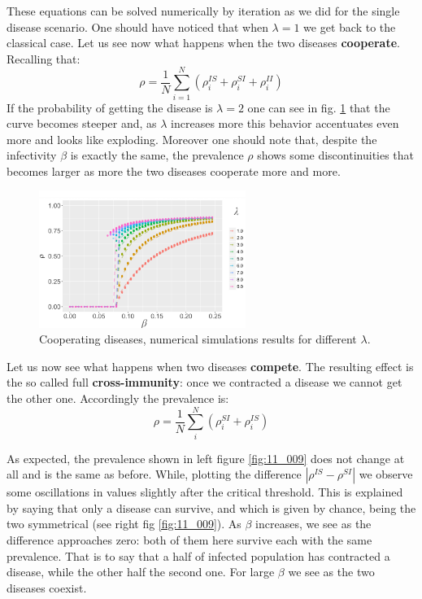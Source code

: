 \documentclass[../main/main.tex]{subfiles}
\begin{document}
These equations can be solved numerically by iteration as we did for the single disease scenario. One should have noticed that when \( \lambda = 1 \) we get back to the classical case. Let us see now what happens when the two diseases \textbf{cooperate}. Recalling that:
\begin{equation}
    \rho = \frac{1}{N} \sum_{i=1}^N (\rho_i^{IS} + \rho_i^{SI} + \rho_i^{II})
\end{equation}
If the probability of getting the disease is \( \lambda = 2 \) one can see in fig. \ref{fig:11_007} that the curve becomes steeper and, as $\lambda$ increases more this behavior accentuates even more and looks like exploding. Moreover one should note that, despite the infectivity $\beta$ is exactly the same, the prevalence $\rho$ shows some discontinuities that becomes larger as more the two diseases cooperate more and more.

\begin{figure}[h!]
\centering
\includegraphics[width=0.6\textwidth]{../lessons/image/11/image007.png}
\caption{\label{fig:11_007} Cooperating diseases, numerical simulations results for different $\lambda$. }
\end{figure}

Let us now see what happens when two diseases \textbf{compete}. The resulting effect is the so called full \textbf{cross-immunity}: once we contracted a disease we cannot get the other one. Accordingly the prevalence is:
\begin{equation}
    \rho = \frac{1}{N} \sum_{i}^N (\rho_i^{SI} + \rho_i^{IS})
\end{equation}

As expected, the prevalence shown in left figure \ref{fig:11_009} does not change at all and is the same as before. While, plotting the difference $|\rho^{IS} - \rho^{SI}|$ we observe some oscillations in values slightly after the critical threshold. This is explained by saying that only a disease can survive, and which is given by chance, being the two symmetrical (see right fig \ref{fig:11_009}). As $\beta$ increases, we see as the difference approaches zero: both of them here survive each with the same prevalence. That is to say that a half of infected population has contracted a disease, while the other half the second one. For large $\beta$ we see as the two diseases coexist.
\end{document}
